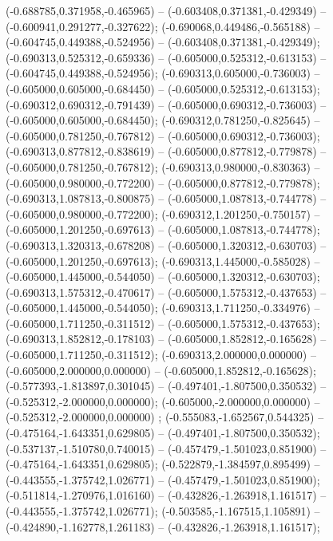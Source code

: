  (-0.688785,0.371958,-0.465965) -- (-0.603408,0.371381,-0.429349) -- (-0.600941,0.291277,-0.327622);
 (-0.690068,0.449486,-0.565188) -- (-0.604745,0.449388,-0.524956) -- (-0.603408,0.371381,-0.429349);
 (-0.690313,0.525312,-0.659336) -- (-0.605000,0.525312,-0.613153) -- (-0.604745,0.449388,-0.524956);
 (-0.690313,0.605000,-0.736003) -- (-0.605000,0.605000,-0.684450) -- (-0.605000,0.525312,-0.613153);
 (-0.690312,0.690312,-0.791439) -- (-0.605000,0.690312,-0.736003) -- (-0.605000,0.605000,-0.684450);
 (-0.690312,0.781250,-0.825645) -- (-0.605000,0.781250,-0.767812) -- (-0.605000,0.690312,-0.736003);
 (-0.690313,0.877812,-0.838619) -- (-0.605000,0.877812,-0.779878) -- (-0.605000,0.781250,-0.767812);
 (-0.690313,0.980000,-0.830363) -- (-0.605000,0.980000,-0.772200) -- (-0.605000,0.877812,-0.779878);
 (-0.690313,1.087813,-0.800875) -- (-0.605000,1.087813,-0.744778) -- (-0.605000,0.980000,-0.772200);
 (-0.690312,1.201250,-0.750157) -- (-0.605000,1.201250,-0.697613) -- (-0.605000,1.087813,-0.744778);
 (-0.690313,1.320313,-0.678208) -- (-0.605000,1.320312,-0.630703) -- (-0.605000,1.201250,-0.697613);
 (-0.690313,1.445000,-0.585028) -- (-0.605000,1.445000,-0.544050) -- (-0.605000,1.320312,-0.630703);
 (-0.690313,1.575312,-0.470617) -- (-0.605000,1.575312,-0.437653) -- (-0.605000,1.445000,-0.544050);
 (-0.690313,1.711250,-0.334976) -- (-0.605000,1.711250,-0.311512) -- (-0.605000,1.575312,-0.437653);
 (-0.690313,1.852812,-0.178103) -- (-0.605000,1.852812,-0.165628) -- (-0.605000,1.711250,-0.311512);
 (-0.690313,2.000000,0.000000) -- (-0.605000,2.000000,0.000000) -- (-0.605000,1.852812,-0.165628);
 (-0.577393,-1.813897,0.301045) -- (-0.497401,-1.807500,0.350532) -- (-0.525312,-2.000000,0.000000);
 (-0.605000,-2.000000,0.000000) -- (-0.525312,-2.000000,0.000000) ;
 (-0.555083,-1.652567,0.544325) -- (-0.475164,-1.643351,0.629805) -- (-0.497401,-1.807500,0.350532);
 (-0.537137,-1.510780,0.740015) -- (-0.457479,-1.501023,0.851900) -- (-0.475164,-1.643351,0.629805);
 (-0.522879,-1.384597,0.895499) -- (-0.443555,-1.375742,1.026771) -- (-0.457479,-1.501023,0.851900);
 (-0.511814,-1.270976,1.016160) -- (-0.432826,-1.263918,1.161517) -- (-0.443555,-1.375742,1.026771);
 (-0.503585,-1.167515,1.105891) -- (-0.424890,-1.162778,1.261183) -- (-0.432826,-1.263918,1.161517);
